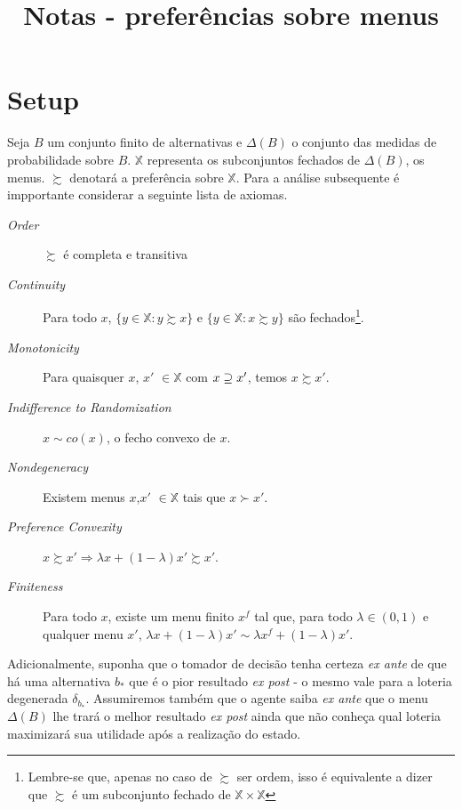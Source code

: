 \documentclass[11pt, a4paper]{article}
\title{Notas - preferências sobre menus}
\author{}
\theoremstyle{nonumberplain}
\theoremstyle{plain}
\theoremstyle{plain}
\begin{document}
\maketitle 

\tableofcontents

\section{Setup}
Seja $B$ um conjunto finito de alternativas e $\Delta(B)$ o conjunto das medidas de probabilidade sobre $B$. $\mathbb{X}$ representa os subconjuntos fechados de $\Delta(B)$, os menus. $\succsim$ denotará a preferência sobre $\mathbb{X}$. Para a análise subsequente é impportante considerar a seguinte lista de axiomas.
\begin{description}
\item [\textit{Order}] $\succsim$ é completa e transitiva  
\item [\textit{Continuity}] Para todo $x$, $\{y\in \mathbb{X}:y\succsim x\}$ e $\{y\in \mathbb{X}:x\succsim y\}$ são fechados\footnote{Lembre-se que, apenas no caso de $\succsim$ ser ordem, isso é equivalente a dizer que $\succsim$ é um subconjunto fechado de $\mathbb{X}\times\mathbb{X}$}. 
\item [\textit{Monotonicity}] Para quaisquer $x$, $x'$ $\in\mathbb{X}$ com $x\begin{small}\supseteq\end{small} x'$, temos $x\succsim x'$. 
\item [\textit{Indifference to Randomization}] $x\sim co(x)$, o fecho convexo de $x$. 
\item [\textit{Nondegeneracy}] Existem menus $x$,$x'$ $\in \mathbb{X}$ tais que $x\succ x'$.
\item [\textit{Preference Convexity}] $x\succsim x' \Rightarrow \lambda x +(1-\lambda)x'\succsim x'$.
\item[\textit{Finiteness}] Para todo $x$, existe um menu finito $x^f$ tal que, para todo $\lambda\in (0,1)$ e qualquer menu $x'$, $\lambda x +(1-\lambda)x' \sim \lambda x^f +(1-\lambda)x'$.
\end{description}  

Adicionalmente, suponha que o tomador de decisão tenha certeza \textit{ex ante} de que há uma alternativa $b_*$ que é o pior resultado \textit{ex post} - o mesmo vale para a loteria degenerada $\delta_{b_*}$. Assumiremos também que o agente saiba \textit{ex ante} que o menu $\Delta(B)$ lhe trará o melhor resultado \textit{ex post} ainda que não conheça qual loteria maximizará sua utilidade após a realização do estado.   
\end{document}
